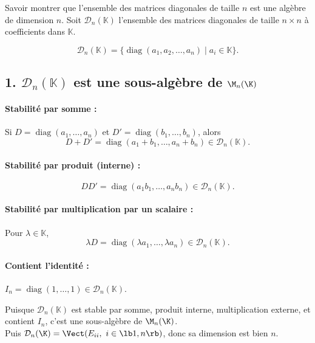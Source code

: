 \documentclass[french, 11pt]{article}
\begin{document}
\begin{exercice}{}{}
    Savoir montrer que l'ensemble des matrices diagonales de taille $n$ est une algèbre de dimension $n$.
    \tcblower
    Soit \( \mathcal{D}_n(\mathbb{K}) \) l'ensemble des matrices diagonales de taille \( n \times n \) à coefficients dans \(\mathbb{K}\).

    \[
    \mathcal{D}_n(\mathbb{K}) = \{ 
    \operatorname{diag}(a_1, a_2, \dots, a_n) \mid a_i \in \mathbb{K} \}.
    \]

    \subsection*{1. \( \mathcal{D}_n(\mathbb{K}) \) est une sous-algèbre de \( \M_n(\K) \)}

    \paragraph{Stabilité par somme :} 
    Si \( D = \operatorname{diag}(a_1,\dots,a_n) \) et \( D' = \operatorname{diag}(b_1,\dots,b_n) \), alors
    \[
    D + D' = \operatorname{diag}(a_1+b_1,\dots,a_n+b_n) \in \mathcal{D}_n(\mathbb{K}).
    \]

    \paragraph{Stabilité par produit (interne) :} 
    \[
    D D' = \operatorname{diag}(a_1 b_1, \dots, a_n b_n) \in \mathcal{D}_n(\mathbb{K}).
    \]

    \paragraph{Stabilité par multiplication par un scalaire :} 
    Pour \( \lambda \in \mathbb{K} \),
    \[
    \lambda D = \operatorname{diag}(\lambda a_1, \dots, \lambda a_n) \in \mathcal{D}_n(\mathbb{K}).
    \]

    \paragraph{Contient l’identité :} 
    \( I_n = \operatorname{diag}(1,\dots,1) \in \mathcal{D}_n(\mathbb{K}) \).

    Puisque \(\mathcal{D}_n(\mathbb{K})\) est stable par somme, produit interne, multiplication externe, et contient \(I_n\), c’est une sous-algèbre de \( \M_n(\K) \).\\
    Puis $\mathcal{D}_n(\K) = \Vect(E_{ii},~i\in \lb 1,n\rb)$, donc sa dimension est bien $n$.
\end{exercice}
\end{document}
